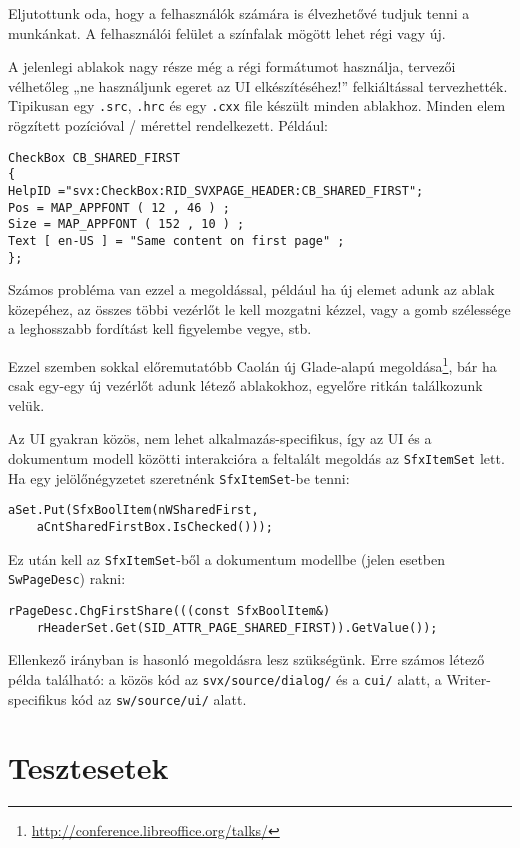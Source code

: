 \documentclass[a4paper]{report}
\begin{document}
Eljutottunk oda, hogy a felhasználók számára is élvezhetővé tudjuk tenni a
munkánkat. A felhasználói felület a színfalak mögött lehet régi vagy új.

A jelenlegi ablakok nagy része még a régi formátumot használja, tervezői
vélhetőleg „ne használjunk egeret az UI elkészítéséhez!” felkiáltással
tervezhették. Tipikusan egy \texttt{.src}, \texttt{.hrc} és egy \texttt{.cxx}
file készült minden ablakhoz. Minden elem rögzített pozícióval / mérettel
rendelkezett. Például:

\begin{verbatim}
CheckBox CB_SHARED_FIRST
{
HelpID ="svx:CheckBox:RID_SVXPAGE_HEADER:CB_SHARED_FIRST";
Pos = MAP_APPFONT ( 12 , 46 ) ;
Size = MAP_APPFONT ( 152 , 10 ) ;
Text [ en-US ] = "Same content on first page" ;
};
\end{verbatim}

Számos probléma van ezzel a megoldással, például ha új elemet adunk az ablak
közepéhez, az összes többi vezérlőt le kell mozgatni kézzel, vagy a gomb
szélessége a leghosszabb fordítást kell figyelembe vegye, stb.

Ezzel szemben sokkal előremutatóbb Caolán új Glade-alapú
megoldása\footnote{\url{http://conference.libreoffice.org/talks/}}, bár ha csak
egy-egy új vezérlőt adunk létező ablakokhoz, egyelőre ritkán találkozunk velük.

Az UI gyakran közös, nem lehet alkalmazás-specifikus, így az UI és a dokumentum modell közötti interakcióra a feltalált megoldás az \texttt{SfxItemSet} lett. Ha egy jelölőnégyzetet szeretnénk \texttt{SfxItemSet}-be tenni:

\begin{verbatim}
aSet.Put(SfxBoolItem(nWSharedFirst,
    aCntSharedFirstBox.IsChecked()));
\end{verbatim}

Ez után kell az \texttt{SfxItemSet}-ből a dokumentum modellbe (jelen esetben \texttt{SwPageDesc}) rakni:

\begin{verbatim}
rPageDesc.ChgFirstShare(((const SfxBoolItem&)
    rHeaderSet.Get(SID_ATTR_PAGE_SHARED_FIRST)).GetValue());
\end{verbatim}

Ellenkező irányban is hasonló megoldásra lesz szükségünk. Erre számos létező
példa található: a közös kód az \texttt{svx/source/dialog/} és a \texttt{cui/}
alatt, a Writer-specifikus kód az \texttt{sw/source/ui/} alatt.

\section{Tesztesetek}
\end{document}
